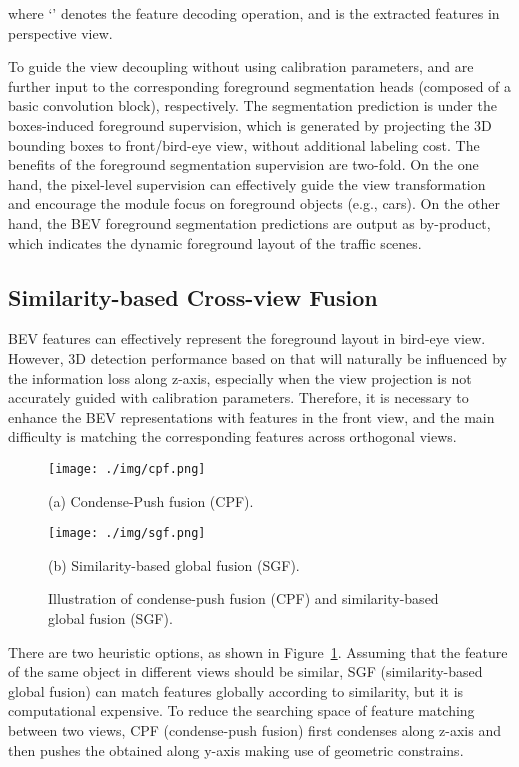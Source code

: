 \documentclass[letterpaper, 10 pt, conference]{ieeeconf}
\begin{document}
where `' denotes the feature decoding operation, and  is the extracted features in perspective view. 

To guide the view decoupling without using calibration parameters,  and  are further input to the corresponding foreground segmentation heads (composed of a basic convolution block), respectively. The segmentation prediction is under the boxes-induced foreground supervision, which is generated by projecting the 3D bounding boxes to front/bird-eye view, without additional labeling cost. The benefits of the foreground segmentation supervision are two-fold. On the one hand, the pixel-level supervision can effectively guide the view transformation and encourage the module focus on foreground objects (e.g., cars). On the other hand, the BEV foreground segmentation predictions are output as by-product, which indicates the dynamic foreground layout of the traffic scenes.

\subsection{Similarity-based Cross-view Fusion}
BEV features can effectively represent the foreground layout in bird-eye view. However, 3D detection performance based on that will naturally be influenced by the information loss along z-axis, especially when the view projection is not accurately guided with calibration parameters. Therefore, it is necessary to enhance the BEV representations with features in the front view, and the main difficulty is matching the corresponding features across orthogonal views. 

\begin{figure}
\footnotesize
\begin{minipage}[b]{1.0\linewidth}
  \centering
  \centerline{\texttt{[image: ./img/cpf.png]}}
  \centerline{(a) Condense-Push fusion (CPF).}\medskip
\end{minipage}
 \vspace{1pt}
\begin{minipage}[b]{1.0\linewidth}
  \centering
  \centerline{\texttt{[image: ./img/sgf.png]}}
  \centerline{(b) Similarity-based global fusion (SGF).}\medskip
\end{minipage}

\caption{Illustration of condense-push fusion (CPF) and similarity-based global fusion (SGF).}
\label{fig:fusion}
\end{figure}

There are two heuristic options, as shown in Figure~\ref{fig:fusion}. Assuming that the feature of the same object in different views should be similar, SGF (similarity-based global fusion) can match features globally according to similarity, but it is computational expensive. To reduce the searching space of feature matching between two views, CPF (condense-push fusion) first condenses  along z-axis and then pushes the obtained  along 
y-axis making use of geometric constrains. 
\end{document}
